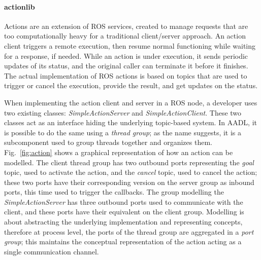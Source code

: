\paragraph{actionlib} Actions are an extension of ROS services, created to manage requests that are too computationally heavy for a traditional client/server approach. An action client triggers a remote execution, then resume normal functioning while waiting for a response, if needed. While an action is under execution, it sends periodic updates of its status, and the original caller can terminate it before it finishes. The actual implementation of ROS actions is based on topics that are used to trigger or cancel the execution, provide the result, and get updates on the status.
 
When implementing the action client and server in a ROS node, a developer uses two existing classes: \textit{SimpleActionServer} and \textit{SimpleActionClient}. These two classes act as an interface hiding the underlying topic-based system. In AADL, it is possible to do the same using a \textit{thread group}; as the name suggests, it is a subcomponent used to group threads together and organizes them. Fig.~\ref{fig:action} shows a graphical representation of how an action can be modelled. The client thread group has two outbound ports representing the \textit{goal} topic, used to activate the action, and the \textit{cancel} topic, used to cancel the action; these two ports have their corresponding version on the server group as inbound ports, this time used to trigger the callbacks. The group modelling the \textit{SimpleActionServer} has three outbound ports used to communicate with the client, and these ports have their equivalent on the client group. Modelling is about abstracting the underlying implementation and representing concepts, therefore at process level, the ports of the thread group are aggregated in a \textit{port group}; this maintains the conceptual representation of the action acting as a single communication channel.

